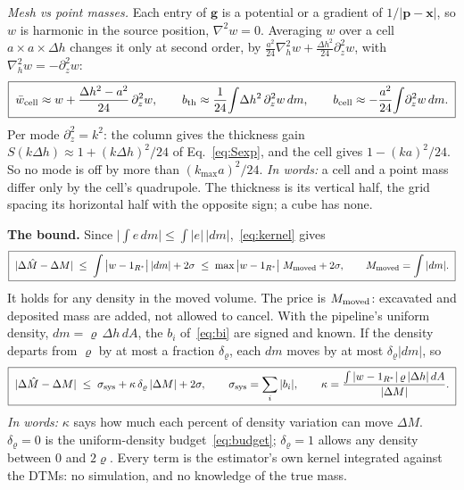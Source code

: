 \documentclass[11pt]{article}
\newcommand{\words}[1]{\emph{In words:} #1}
\begin{document}
\emph{Mesh vs point masses.} Each entry of $\mathbf g$ is a potential or a
gradient of $1/|\mathbf p-\mathbf x|$, so $w$ is harmonic in the source
position, $\nabla^2w=0$. Averaging $w$ over a cell $a\times a\times\Delta h$
changes it only at second order, by
$\tfrac{a^2}{24}\nabla_h^2w+\tfrac{\Delta h^2}{24}\partial_z^2w$, with
$\nabla_h^2w=-\partial_z^2w$:
\begin{equation}
  \boxed{\;\bar w_{\rm cell}\approx w+\frac{\Delta h^2-a^2}{24}\,\partial_z^2w,\qquad
  b_{\rm th}\approx\frac1{24}\!\int\!\Delta h^2\,\partial_z^2w\,dm,\qquad
  b_{\rm cell}\approx-\frac{a^2}{24}\!\int\!\partial_z^2w\,dm.\;}
  \label{eq:cell}
\end{equation}
Per mode $\partial_z^2=k^2$: the column gives the thickness gain
$S(k\Delta h)\approx1+(k\Delta h)^2/24$ of Eq.~\eqref{eq:Sexp}, and the cell
gives $1-(ka)^2/24$. So no mode is off by more than $(k_{\max}a)^2/24$.
\words{a cell and a point mass differ only by the cell's quadrupole. The
thickness is its vertical half, the grid spacing its horizontal half with the
opposite sign; a cube has none.}

\textbf{The bound.} Since
$\big|\int e\,dm\big|\le\int|e|\,|dm|$,~\eqref{eq:kernel} gives
\begin{equation}
  \boxed{\;|\Delta\hat M-\Delta M|\;\le\;\int\big|w-1_{R^*}\big|\,|dm|+2\sigma
  \;\le\;\max\big|w-1_{R^*}\big|\;M_{\rm moved}+2\sigma,
  \qquad M_{\rm moved}=\int|dm|.\;}
  \label{eq:anyrho}
\end{equation}
It holds for any density in the moved volume. The price is $M_{\rm moved}$:
excavated and deposited mass are added, not allowed to cancel. With the
pipeline's uniform density, $dm=\varrho\,\Delta h\,dA$, the $b_i$
of~\eqref{eq:bi} are signed and known. If the density departs from $\varrho$
by at most a fraction $\delta_\varrho$, each $dm$ moves by at most
$\delta_\varrho|dm|$, so
\begin{equation}
  \boxed{\;|\Delta\hat M-\Delta M|\;\le\;\sigma_{\rm sys}
  +\kappa\,\delta_\varrho\,|\Delta M|+2\sigma,\qquad
  \sigma_{\rm sys}=\sum_i|b_i|,\qquad
  \kappa=\frac{\int|w-1_{R^*}|\,\varrho\,|\Delta h|\,dA}{|\Delta M|}.\;}
  \label{eq:final}
\end{equation}
\words{$\kappa$ says how much each percent of density variation can move
$\Delta M$. $\delta_\varrho=0$ is the uniform-density budget~\eqref{eq:budget};
$\delta_\varrho=1$ allows any density between $0$ and $2\varrho$. Every term
is the estimator's own kernel integrated against the DTMs: no simulation, and
no knowledge of the true mass.}
\end{document}
